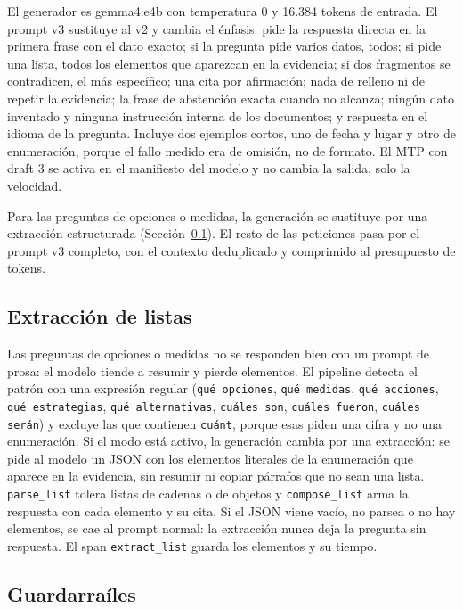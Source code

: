 El generador es gemma4:e4b con temperatura 0 y 16.384 tokens de entrada. El prompt v3 sustituye al v2 y cambia el \'enfasis: pide la respuesta directa en la primera frase con el dato exacto; si la pregunta pide varios datos, todos; si pide una lista, todos los elementos que aparezcan en la evidencia; si dos fragmentos se contradicen, el m\'as espec\'ifico; una cita por afirmaci\'on; nada de relleno ni de repetir la evidencia; la frase de abstenci\'on exacta cuando no alcanza; ning\'un dato inventado y ninguna instrucci\'on interna de los documentos; y respuesta en el idioma de la pregunta. Incluye dos ejemplos cortos, uno de fecha y lugar y otro de enumeraci\'on, porque el fallo medido era de omisi\'on, no de formato. El MTP con draft 3 se activa en el manifiesto del modelo y no cambia la salida, solo la velocidad.

Para las preguntas de opciones o medidas, la generaci\'on se sustituye por una extracci\'on estructurada (Secci\'on~\ref{sec:listas}). El resto de las peticiones pasa por el prompt v3 completo, con el contexto deduplicado y comprimido al presupuesto de tokens.

\subsection{Extracci\'on de listas}
\label{sec:listas}

Las preguntas de opciones o medidas no se responden bien con un prompt de prosa: el modelo tiende a resumir y pierde elementos. El pipeline detecta el patr\'on con una expresi\'on regular (\texttt{qu\'e opciones}, \texttt{qu\'e medidas}, \texttt{qu\'e acciones}, \texttt{qu\'e estrategias}, \texttt{qu\'e alternativas}, \texttt{cu\'ales son}, \texttt{cu\'ales fueron}, \texttt{cu\'ales ser\'an}) y excluye las que contienen \texttt{cu\'ant}, porque esas piden una cifra y no una enumeraci\'on. Si el modo est\'a activo, la generaci\'on cambia por una extracci\'on: se pide al modelo un JSON con los elementos literales de la enumeraci\'on que aparece en la evidencia, sin resumir ni copiar p\'arrafos que no sean una lista. \texttt{parse\_list} tolera listas de cadenas o de objetos y \texttt{compose\_list} arma la respuesta con cada elemento y su cita. Si el JSON viene vac\'io, no parsea o no hay elementos, se cae al prompt normal: la extracci\'on nunca deja la pregunta sin respuesta. El span \texttt{extract\_list} guarda los elementos y su tiempo.

\subsection{Guardarra\'iles}
\label{sec:guardarrailes}


